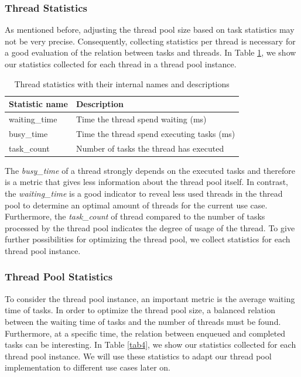\documentclass[conference]{IEEEtran}
\begin{document}
\subsubsection{Thread Statistics}
As mentioned before, adjusting the thread pool size based on task statistics may not be very precise. Consequently, collecting statistics per thread is necessary for a good evaluation of the relation between tasks and threads. In Table \ref{tab3}, we show our statistics collected for each thread in a thread pool instance.

\begin{table}[htbp]
	\caption{Thread statistics with their internal names and descriptions}
	\begin{center}
		\begin{tabular}{ l l }
			\hline
			\textbf{Statistic name}&\textbf{Description}\\
			\hline
			waiting\_time & Time the thread spend waiting (ms) \\
			busy\_time & Time the thread spend executing tasks (ms)\\
			task\_count & Number of tasks the thread has executed \\
			\hline
		\end{tabular}
		\label{tab3}
	\end{center}
\end{table}

The \emph{busy\_time} of a thread strongly depends on the executed tasks and therefore is a metric that gives less information about the thread pool itself. In contrast, the \emph{waiting\_time} is a good indicator to reveal less used threads in the thread pool to determine an optimal amount of threads for the current use case. Furthermore, the \emph{task\_count} of thread compared to the number of tasks processed by the thread pool indicates the degree of usage of the thread. To give further possibilities for optimizing the thread pool, we collect statistics for each thread pool instance.

\subsubsection{Thread Pool Statistics}
To consider the thread pool instance, an important metric is the average waiting time of tasks. In order to optimize the thread pool size, a balanced relation between the waiting time of tasks and the number of threads must be found. Furthermore, at a specific time, the relation between enqueued and completed tasks can be interesting. In Table \ref{tab4}, we show our statistics collected for each thread pool instance. We will use these statistics to adapt our thread pool implementation to different use cases later on.
\end{document}
